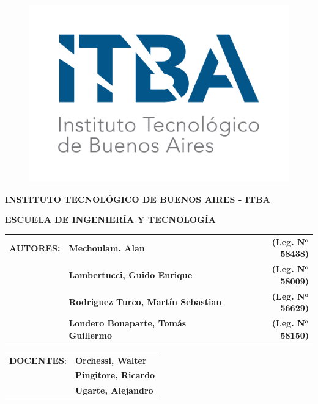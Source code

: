 \begin{titlepage}


\begin{figure}[H]
	\includegraphics[width=0.3\linewidth, right]{./ITBA_1}
\end{figure}

\vspace*{1.5cm}

\textbf{INSTITUTO TECNOLÓGICO DE BUENOS AIRES - ITBA}

\textbf{ESCUELA DE INGENIERÍA Y TECNOLOGÍA}

\vspace*{4cm}


\vspace*{2.5cm}

\begin{tabular}{llr} 
	\textbf{AUTORES:} & \textbf{Mechoulam, Alan}  &  \textbf{(Leg. N}$\mathbf{^o}$ \textbf{58438)}\\
	 & \textbf{Lambertucci, Guido Enrique} & \textbf{(Leg. N}$\mathbf{^o}$ \textbf{58009)} \\
	 & \textbf{Rodriguez Turco, Martín Sebastian} & \textbf{(Leg. N}$\mathbf{^o}$ \textbf{56629)} \\
	 & \textbf{Londero Bonaparte, Tomás Guillermo} & \textbf{(Leg. N}$\mathbf{^o}$ \textbf{58150)} \\
\end{tabular}

\vspace*{1.5cm}

\begin{tabular}{ll}
	\textbf{DOCENTES}: & \textbf{Orchessi, Walter}\\
	 & \textbf{Pingitore, Ricardo} \\
	 & \textbf{Ugarte, Alejandro} \\
\end{tabular}

\end{titlepage}
